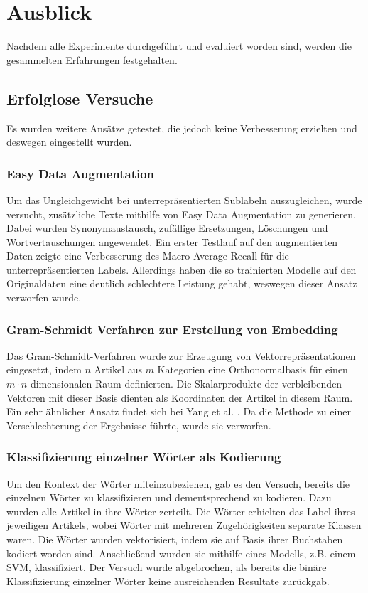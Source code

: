 \section{Ausblick}
\label{Ausblick}
Nachdem alle Experimente durchgeführt und evaluiert worden sind, werden die gesammelten Erfahrungen festgehalten.

\subsection{Erfolglose Versuche}
Es wurden weitere Ansätze getestet, die jedoch keine Verbesserung erzielten und deswegen eingestellt wurden.

\subsubsection{Easy Data Augmentation}
\label{EDA}
Um das Ungleichgewicht bei unterrepräsentierten Sublabeln auszugleichen, wurde versucht, zusätzliche Texte mithilfe von Easy Data Augmentation \cite{Wei2019} zu generieren. Dabei wurden Synonymaustausch, zufällige Ersetzungen, Löschungen und Wortvertauschungen angewendet. Ein erster Testlauf  auf den augmentierten Daten zeigte eine Verbesserung  des Macro Average Recall für die unterrepräsentierten Labels. Allerdings haben die so trainierten Modelle auf den Originaldaten eine deutlich schlechtere Leistung gehabt, weswegen dieser Ansatz verworfen wurde.

\subsubsection{Gram-Schmidt Verfahren zur Erstellung von Embedding}
\label{sec:gram}
Das Gram-Schmidt-Verfahren wurde zur Erzeugung von Vektorrepräsentationen eingesetzt, indem $n$ Artikel aus $m$ Kategorien eine Orthonormalbasis für einen $m\cdot n$-dimensionalen Raum definierten. Die Skalarprodukte der verbleibenden Vektoren mit dieser Basis dienten als Koordinaten der Artikel in diesem Raum. Ein sehr ähnlicher Ansatz findet sich bei Yang et al. \cite{Yang2019}. Da die Methode zu einer Verschlechterung der Ergebnisse führte, wurde sie verworfen.

\subsubsection{Klassifizierung einzelner Wörter als Kodierung}
\label{sec:wordcoding}
Um den Kontext der Wörter miteinzubeziehen, gab es den Versuch, bereits die einzelnen Wörter zu klassifizieren und dementsprechend zu kodieren. Dazu wurden alle Artikel in ihre Wörter zerteilt. Die Wörter erhielten das Label ihres jeweiligen Artikels, wobei Wörter mit mehreren Zugehörigkeiten separate Klassen waren. Die Wörter wurden vektorisiert, indem sie auf Basis ihrer Buchstaben kodiert worden sind. Anschließend wurden sie mithilfe eines Modells, z.B. einem SVM, klassifiziert. Der Versuch wurde abgebrochen, als bereits die binäre Klassifizierung einzelner Wörter keine ausreichenden Resultate zurückgab.

